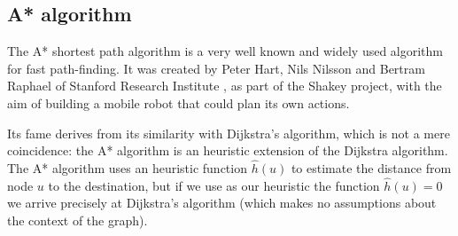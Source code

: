 \documentclass{report}[a4paper]
\theoremstyle{remark}
\begin{document}
\subsection{A* algorithm}
The A* shortest path algorithm is a very well known and widely used algorithm for fast path-finding. It was created by Peter Hart, Nils Nilsson and Bertram Raphael of Stanford Research Institute \cite{Astar}, as part of the Shakey project, with the aim of building a mobile robot that could plan its own actions.\par
Its fame derives from its similarity with Dijkstra's algorithm, which is not a mere coincidence: the A* algorithm is an heuristic extension of the Dijkstra algorithm. The A* algorithm uses an heuristic function $\hat{h}(u)$ to estimate the distance from node $u$ to the destination, but if we use as our heuristic the function $\hat{h}(u) = 0$ we arrive precisely at Dijkstra's algorithm (which makes no assumptions about the context of the graph).
\end{document}
